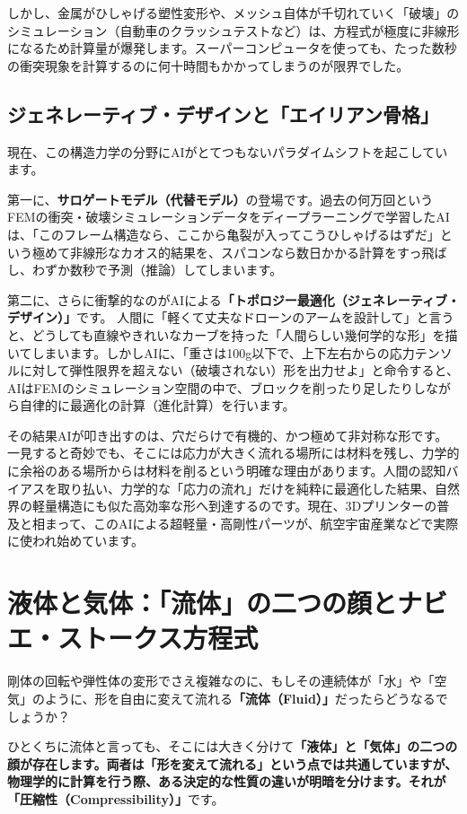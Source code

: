 しかし、金属がひしゃげる塑性変形や、メッシュ自体が千切れていく「破壊」のシミュレーション（自動車のクラッシュテストなど）は、方程式が極度に非線形になるため計算量が爆発します。スーパーコンピュータを使っても、たった数秒の衝突現象を計算するのに何十時間もかかってしまうのが限界でした。

\subsection{ジェネレーティブ・デザインと「エイリアン骨格」}

現在、この構造力学の分野にAIがとてつもないパラダイムシフトを起こしています。

第一に、\textbf{サロゲートモデル（代替モデル）}の登場です。過去の何万回というFEMの衝突・破壊シミュレーションデータをディープラーニングで学習したAIは、「このフレーム構造なら、ここから亀裂が入ってこうひしゃげるはずだ」という極めて非線形なカオス的結果を、スパコンなら数日かかる計算をすっ飛ばし、わずか数秒で予測（推論）してしまいます。

第二に、さらに衝撃的なのがAIによる\textbf{「トポロジー最適化（ジェネレーティブ・デザイン）」}です。 人間に「軽くて丈夫なドローンのアームを設計して」と言うと、どうしても直線やきれいなカーブを持った「人間らしい幾何学的な形」を描いてしまいます。しかしAIに、「重さは100g以下で、上下左右からの応力テンソルに対して弾性限界を超えない（破壊されない）形を出力せよ」と命令すると、AIはFEMのシミュレーション空間の中で、ブロックを削ったり足したりしながら自律的に最適化の計算（進化計算）を行います。

その結果AIが叩き出すのは、穴だらけで有機的、かつ極めて非対称な形です。一見すると奇妙でも、そこには応力が大きく流れる場所には材料を残し、力学的に余裕のある場所からは材料を削るという明確な理由があります。人間の認知バイアスを取り払い、力学的な「応力の流れ」だけを純粋に最適化した結果、自然界の軽量構造にも似た高効率な形へ到達するのです。現在、3Dプリンターの普及と相まって、このAIによる超軽量・高剛性パーツが、航空宇宙産業などで実際に使われ始めています。

\section{液体と気体：「流体」の二つの顔とナビエ・ストークス方程式}

剛体の回転や弾性体の変形でさえ複雑なのに、もしその連続体が「水」や「空気」のように、形を自由に変えて流れる\textbf{「流体（Fluid）」}だったらどうなるでしょうか？

ひとくちに流体と言っても、そこには大きく分けて\textbf{「液体」と「気体」の二つの顔が存在します。両者は「形を変えて流れる」という点では共通していますが、物理学的に計算を行う際、ある決定的な性質の違いが明暗を分けます。それが「圧縮性（Compressibility）」}です。

